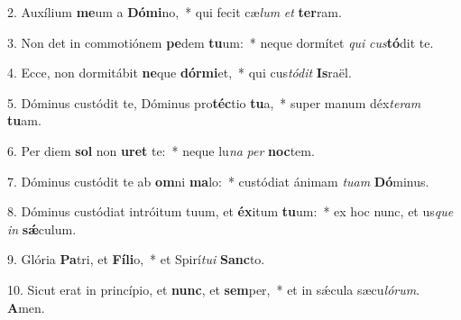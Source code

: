 2. Auxílium \textbf{me}um a \textbf{Dó}\textbf{mi}no,~*  qui fecit cæ\textit{lum} \textit{et} \textbf{ter}ram.\

3. Non det in commotiónem \textbf{pe}dem \textbf{tu}um:~*  neque dormítet \textit{qui} \textit{cus}\textbf{tó}dit te.\

4. Ecce, non dormitábit \textbf{ne}que \textbf{dór}\textbf{mi}et,~*  qui cus\textit{tó}\textit{dit} \textbf{Is}raël.\

5. Dóminus custódit te, Dóminus pro\textbf{téc}tio \textbf{tu}a,~*  super manum déx\textit{te}\textit{ram} \textbf{tu}am.\

6. Per diem \textbf{sol} non \textbf{u}\textbf{ret} te:~*  neque lu\textit{na} \textit{per} \textbf{noc}tem.\

7. Dóminus custódit te ab \textbf{om}ni \textbf{ma}lo:~*  custódiat ánimam \textit{tu}\textit{am} \textbf{Dó}minus.\

8. Dóminus custódiat intróitum tuum, et \textbf{éx}itum \textbf{tu}um:~*  ex hoc nunc, et us\textit{que} \textit{in} \textbf{sǽ}culum.\

9. Glória \textbf{Pa}tri, et \textbf{Fí}\textbf{li}o,~*  et Spirí\textit{tu}\textit{i} \textbf{Sanc}to.\

10. Sicut erat in princípio, et \textbf{nunc}, et \textbf{sem}per,~*  et in sǽcula sæcu\textit{ló}\textit{rum}. \textbf{A}men.\

